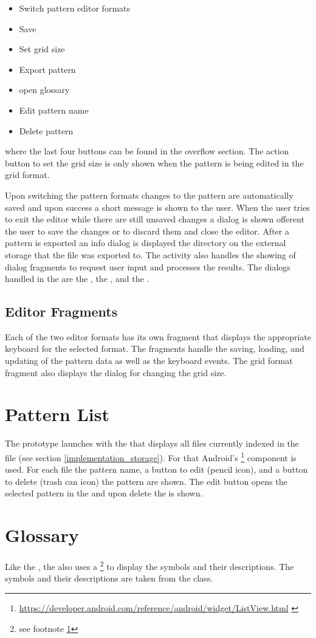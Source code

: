 \begin{itemize}
\item Switch pattern editor formats
\item Save
\item Set grid size
\item Export pattern
\item open glossary
\item Edit pattern name
\item Delete pattern
\end{itemize}

where the last four buttons can be found in the overflow section. The action button to set the grid size is only shown when the pattern is being edited in the grid format.

Upon switching the pattern formats changes to the pattern are automatically saved and upon success a short message is shown to the user. When the user tries to exit the editor while there are still unsaved changes a dialog is shown offerent the user to save the changes or to discard them and close the editor. After a pattern is exported an info dialog is displayed the directory on the external storage that the file was exported to.
The activity also handles the showing of dialog fragments to request user input and processes the results. The dialogs handled in the  are the , the , and the .

\subsection*{Editor Fragments}
Each of the two editor formats has its own fragment that displays the appropriate keyboard for the selected format. The fragments handle the saving, loading, and updating of the pattern data as well as the keyboard events. The grid format fragment also displays the dialog for changing the grid size.

\section{Pattern List}
The prototype launches with the  that displays all files currently indexed in the  file (see section \ref{implementation_storage}). For that Android's \footnote{\url{https://developer.android.com/reference/android/widget/ListView.html} \label{url_footnote}} component is used. For each file the pattern name, a button to edit (pencil icon), and a button to delete (trash can icon) the pattern are shown. The edit button opens the selected pattern in the  and upon delete the  is shown.

\section{Glossary}
Like the , the  also uses a \footnote{see footnote \ref{url_footnote}} to display the symbols and their descriptions. The symbols and their descriptions are taken from the  class.